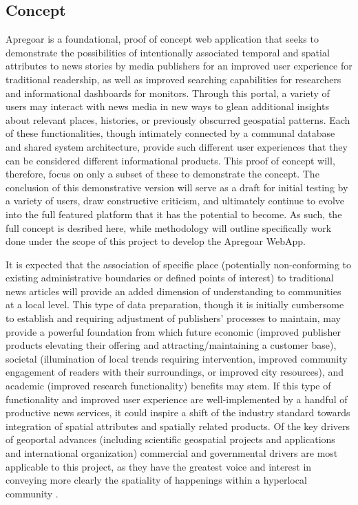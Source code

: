 \subsection {Concept}
Apregoar is a foundational, proof of concept web application that seeks to demonstrate the possibilities of intentionally associated temporal and spatial attributes to news stories by media publishers for an improved user experience for traditional readership, as well as improved searching capabilities for researchers and informational dashboards for monitors. Through this portal, a variety of users may interact with news media in new ways to glean additional insights about relevant places, histories, or previously obscurred geospatial patterns. Each of these functionalities, though intimately connected by a communal database and shared system architecture, provide such different user experiences that they can be considered different informational products. This proof of concept will, therefore, focus on only a subset of these to demonstrate the concept. The conclusion of this demonstrative version will serve as a draft for initial testing by a variety of users, draw constructive criticism, and ultimately continue to evolve into the full featured platform that it has the potential to become. As such, the full concept is desribed here, while methodology will outline specifically work done under the scope of this project to develop the Apregoar WebApp.

 It is expected that the association of specific place (potentially non-conforming to existing administrative boundaries or defined points of interest) to traditional news articles will provide an added dimension of understanding to communities at a local level.  This type of data preparation, though it is initially cumbersome to establish and requiring adjustment of publishers' processes to maintain, may provide a powerful foundation from which future economic (improved publisher products elevating their offering and attracting/maintaining a customer base), societal (illumination of local trends requiring intervention, improved community engagement of readers with their surroundings, or improved city resources), and academic (improved research functionality) benefits may stem.  If this type of functionality and improved user experience are well-implemented by a handful of productive news services, it could inspire a shift of the industry standard towards integration of spatial attributes and spatially related products. Of the key drivers of geoportal advances (including  scientific geospatial projects and applications and international organization) commercial and governmental drivers are most applicable to this project, as they have the greatest voice and interest in conveying more clearly the spatiality of happenings within a hyperlocal community \cite{Jiang2020}.%


